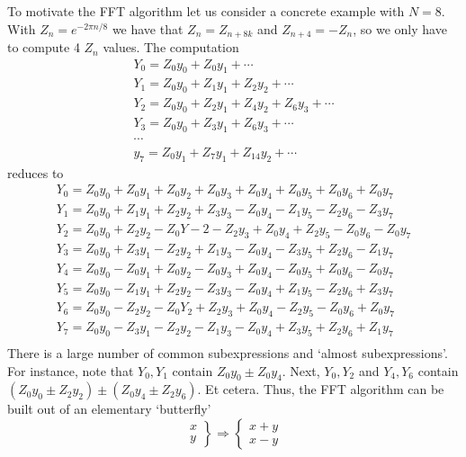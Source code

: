To motivate the \acf{FFT} algorithm let us consider a concrete example
with $N=8$. With $Z_n=e^{-2\pi n/8}$ we have that $Z_n=Z_{n+8k}$ and
$Z_{n+4}=-Z_n$, so we only have to compute 4 $Z_n$ values. The
computation
\[ 
\begin{array}{l}
  Y_0 = Z_0y_0+Z_0y_1+\cdots\\
  Y_1 = Z_0y_0+Z_1y_1+Z_2y_2+\cdots\\
  Y_2 = Z_0y_0+Z_2y_1+Z_4y_2+Z_6y_3+\cdots\\
  Y_3 = Z_0y_0+Z_3y_1+Z_6y_3+\cdots\\
  \cdots\\
  y_7 = Z_0y_1+Z_7y_1+Z_{14}y_2+\cdots
\end{array}
\]
reduces to 
\[
\begin{array}{l}
  Y_0=Z_0y_0+Z_0y_1+Z_0y_2+Z_0y_3+Z_0y_4+Z_0y_5+Z_0y_6+Z_0y_7 \\
  Y_1=Z_0y_0+Z_1y_1+Z_2y_2+Z_3y_3-Z_0y_4-Z_1y_5-Z_2y_6-Z_3y_7 \\
  Y_2=Z_0y_0+Z_2y_2-Z_0Y-2-Z_2y_3+Z_0y_4+Z_2y_5-Z_0y_6-Z_0y_7 \\
  Y_3=Z_0y_0+Z_3y_1-Z_2y_2+Z_1y_3-Z_0y_4-Z_3y_5+Z_2y_6-Z_1y_7 \\
  Y_4=Z_0y_0-Z_0y_1+Z_0y_2-Z_0y_3+Z_0y_4-Z_0y_5+Z_0y_6-Z_0y_7 \\
  Y_5=Z_0y_0-Z_1y_1+Z_2y_2-Z_3y_3-Z_0y_4+Z_1y_5-Z_2y_6+Z_3y_7 \\
  Y_6=Z_0y_0-Z_2y_2-Z_0Y_2+Z_2y_3+Z_0y_4-Z_2y_5-Z_0y_6+Z_0y_7 \\
  Y_7=Z_0y_0-Z_3y_1-Z_2y_2-Z_1y_3-Z_0y_4+Z_3y_5+Z_2y_6+Z_1y_7 \\
\end{array}
\]
There is a large number of common subexpressions and `almost
subexpressions'. For instance, note that $Y_0,Y_1$ contain $Z_0y_0\pm
Z_0y_4$. Next, $Y_0,Y_2$ and $Y_4,Y_6$ contain $(Z_0y_0\pm Z_2y_2) \pm
(Z_0y_4\pm Z_2y_6)$. Et cetera. Thus, the \ac{FFT} algorithm can be
built out of an elementary `butterfly'
\[
  \left. \begin{array}{r}x\\y\end{array} \right\} 
    \Rightarrow
  \left\{ \begin{array}{r}x+y\\x-y\end{array} \right.
\]

\endinput

